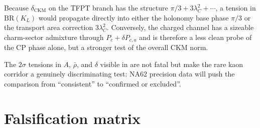 \documentclass[11pt,a4paper]{article}
\theoremstyle{definition}
\theoremstyle{remark}
\newcommand{\BR}{\mathrm{BR}}
\numberwithin{equation}{section}
\begin{document}
Because $\delta_{\mathrm{CKM}}$ on the TFPT branch has the structure
$\pi/3+3\lambda_C^2+\cdots$, a tension in $\BR(K_L)$ would
propagate directly into either the holonomy base phase $\pi/3$
or the transport area correction $3\lambda_C^2$.
Conversely, the charged channel has a sizeable charm-sector
admixture through $P_c+\delta P_{c,u}$ and is therefore a less clean
probe of the CP phase alone, but a stronger test of the overall CKM norm.

The $2\sigma$ tensions in $A$, $\bar\rho$, and $\delta$ visible in
 are not fatal but make the rare kaon corridor a
genuinely discriminating test: NA62 precision data will push the comparison
from ``consistent'' to ``confirmed or excluded''.


\section{Falsification matrix}
\label{sec:falsification}
\end{document}
